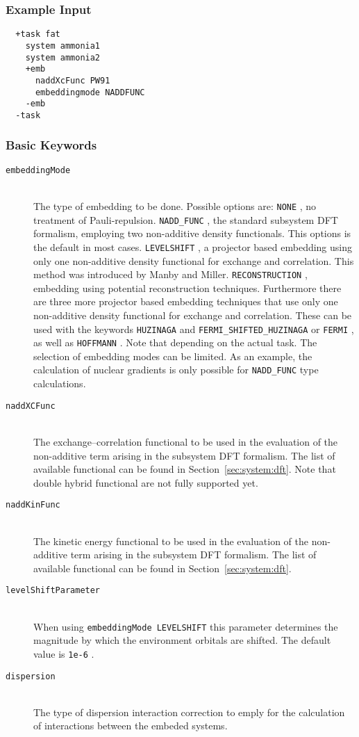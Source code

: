 \documentclass[bibliography=totocnumbered,a4paper,10pt,oneside]{scrbook}
\newcommand{\ttt}[1]{%
  \begingroup\setlength{\fboxsep}{1pt}%
  \colorbox{serenity-green!30}{\texttt{\hspace*{2pt}\vphantom{(g}#1\hspace*{2pt}}}%
  \endgroup
}
\begin{document}
\subsubsection{Example Input}
\begin{lstlisting}
  +task fat
    system ammonia1
    system ammonia2
    +emb
      naddXcFunc PW91
      embeddingmode NADDFUNC
    -emb
  -task
\end{lstlisting}
\subsubsection{Basic Keywords}
\begin{description}
  \item [\texttt{embeddingMode}]\hfill \\
    The type of embedding to be done. Possible options are:
    \ttt{NONE}, no treatment of Pauli-repulsion.
    \ttt{NADD\_FUNC}, the standard subsystem DFT formalism, employing two non-additive density functionals.
    This options is the default in most cases.
    \ttt{LEVELSHIFT}, a projector based embedding using only one non-additive density functional for exchange
    and correlation. This method was introduced by Manby and Miller.
    \ttt{RECONSTRUCTION}, embedding using potential reconstruction techniques.
    Furthermore there are three more projector based embedding techniques that use only one non-additive
    density functional for exchange and correlation. These can be used with the keywords \ttt{HUZINAGA} and
    \ttt{FERMI\_SHIFTED\_HUZINAGA} or \ttt{FERMI}, as well as \ttt{HOFFMANN}.
    Note that depending on the actual task. The selection of embedding modes can be limited. As an example,
    the calculation of nuclear gradients is only possible for \ttt{NADD\_FUNC} type calculations.
  \item [\texttt{naddXCFunc}]\hfill \\
    The exchange--correlation functional to be used in the evaluation of the non-additive term arising in the
    subsystem DFT formalism. The list of available functional can be found in Section~\ref{sec:system:dft}.
    Note that double hybrid functional are not fully supported yet. 
  \item [\texttt{naddKinFunc}]\hfill \\
    The kinetic energy functional to be used in the evaluation of the non-additive term arising in the
    subsystem DFT formalism. The list of available functional can be found in Section~\ref{sec:system:dft}.
  \item [\texttt{levelShiftParameter}]\hfill \\
    When using \ttt{embeddingMode LEVELSHIFT} this parameter determines the magnitude by which the environment
    orbitals are shifted. The default value is \ttt{1e-6}.
  \item [\texttt{dispersion}]\hfill \\
    The type of dispersion interaction correction to emply for the calculation of interactions between the
    embeded systems.
\end{description}
\end{document}

